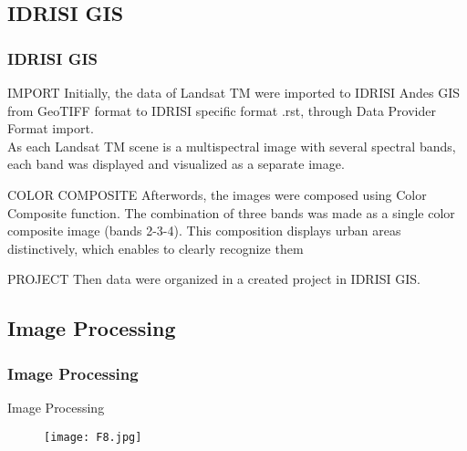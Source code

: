 \documentclass[pdflatex,compress,8pt,
	xcolor={dvipsnames,dvipsnames,svgnames,x11names,table},
	hyperref={	
	breaklinks = true, 
	pdfauthor={Lemenkova Polina}, 
	pdfsubject={Preentation}, 
	pdfcreator={Lemenkova Polina}, 
	pdfproducer={Lemenkova Polina}, 
	colorlinks=true,
	linkcolor=Tomato, 
	citecolor=DeepPink3, 
	urlcolor = NavyBlue, 
	breaklinks = true}]{beamer}
\begin{document}
\subsection{IDRISI GIS}
\begin{frame}\frametitle{IDRISI GIS}

	\begin{block}{IMPORT}
Initially, the data of Landsat TM were imported to IDRISI Andes GIS from \alert{GeoTIFF} format to IDRISI specific format \alert{.rst}, through \alert{Data Provider Format} import.\\ As each Landsat TM scene is a multispectral image with several spectral bands, each band was displayed and visualized as a separate image.
	\end{block}

	\begin{block}{COLOR COMPOSITE}
Afterwords, the images were composed using \alert{Color Composite} function. The combination of three bands was made as a single color composite image (bands 2-3-4). This composition displays urban areas distinctively, which enables to clearly recognize them
	\end{block}

	\begin{block}{PROJECT}
Then data were organized in a created project in \alert{IDRISI GIS}.
	\end{block}

\end{frame}

\subsection{Image Processing}
\begin{frame}\frametitle{Image Processing}
\vspace{3em}
	\begin{examples}{Image Processing}
	\end{examples}
	\begin{figure}[H]
		\centering
			\texttt{[image: F8.jpg]}
	\end{figure}
\end{frame}
\end{document}

